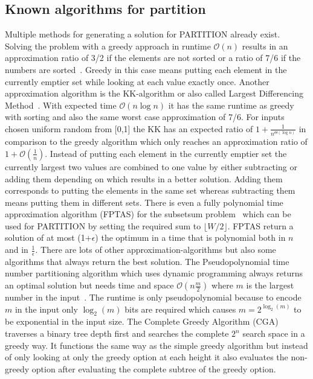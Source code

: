 \subsection{Known algorithms for partition}
Multiple methods for generating a solution for PARTITION already exist.
Solving the problem with a greedy approach in runtime $\mathcal{O}(n)$ results in an approximation ratio of 3/2 if the elements are not sorted or a ratio of 7/6 if the numbers are sorted~\cite{graham1966bounds}.
Greedy in this case means putting each element in the currently emptier set while looking at each value exactly once.
Another approximation algorithm is the KK-algorithm or also called Largest Differencing Method~\cite{karmarkar1982differencing}.
With expected time $\mathcal{O}(n\log{}n)$ it has the same runtime as greedy with sorting and also the same worst case approximation of 7/6.
For inputs chosen uniform random from [0,1] the KK has an expected ratio of \(1+\frac{1}{n^{\Theta(\log{}n)}}\) in comparison to the greedy algorithm which only reaches an approximation ratio of \(1+\mathcal{O}(\frac{1}{n})\).
Instead of putting each element in the currently emptier set the currently largest two values are combined to one value by either subtracting or adding them depending on which results in a better solution.
Adding them corresponds to putting the elements in the same set whereas subtracting them means putting them in different sets. 
There is even a fully polynomial time approximation algorithm (FPTAS) for the subsetsum problem~\cite{KELLERER2003349} which can be used for PARTITION by setting the required sum to $\lfloor W/2\rfloor$.
FPTAS return a solution of at most (1+$\epsilon$) the optimum in a time that is polynomial both in $n$ and in $\frac{1}{\epsilon}$.
There are lots of other approximation-algorithms but also some algorithms that always return the best solution.
The Pseudopolynomial time number partitioning algorithm which uses dynamic programming always returns an optimal solution but needs time and space $\mathcal{O}(n\frac{m}{2})$ where $m$ is the largest number in the input~\cite{korf2009multi}.
The runtime is only pseudopolynomial because to encode $m$ in the input only $\log_{2}{(m)}$ bits are required which causes \(m=2^{\log_{2}{(m)}}\) to be exponential in the input size.
The Complete Greedy Algorithm (CGA)~\cite{korf1998complete} traverses a binary tree depth first and searches the complete $2^n$ search space in a greedy way.
It functions the same way as the simple greedy algorithm but instead of only looking at only the greedy option at each height it also evaluates the non-greedy option after evaluating the complete subtree of the greedy option.
